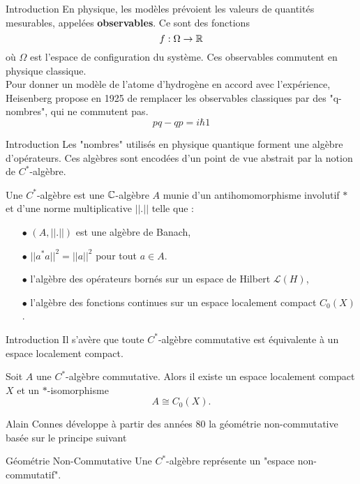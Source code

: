 \begin{frame}{Introduction}
En physique, les modèles prévoient les valeurs de quantités mesurables, appelées \textbf{observables}. Ce sont des fonctions
\[f:\Omega \rightarrow \mathbb R\]
où $\Omega$ est l'espace de configuration du système. Ces observables commutent en physique classique.\\
\vspace{0.3 cm} 
Pour donner un modèle de l'atome d'hydrogène en accord avec l'expérience, Heisenberg propose en 1925 de remplacer les observables classiques par des "q-nombres", qui ne commutent pas.
\[pq -qp = i\hbar 1\]
\end{frame}

\begin{frame}{Introduction}
Les "nombres" utilisés en physique quantique forment une algèbre d'opérateurs. Ces algèbres sont encodées d'un point de vue abstrait par la notion de $C^*$-algèbre. 
\vspace{0.3 cm}
\begin{definitionfr}
Une $C^*$-algèbre est une $\mathbb C$-algèbre $A$ munie d'un antihomomorphisme involutif $*$ et d'une norme multiplicative $||.||$ telle que :
\begin{itemize}
\item[$\bullet$] $(A,||.||)$ est une algèbre de Banach,
\item[$\bullet$] $||a^*a||^2 = ||a||^2$ pour tout $a\in A$.
\end{itemize}
\end{definitionfr}

\begin{itemize}
\item[$\bullet$] l'algèbre des opérateurs bornés sur un espace de Hilbert $\mathcal L(H)$, 
\item[$\bullet$] l'algèbre des fonctions continues sur un espace localement compact $C_0(X)$.
\end{itemize}

\end{frame}

\begin{frame}{Introduction}
Il s'avère que toute $C^*$-algèbre commutative est équivalente à un espace localement compact.
\begin{thmfr}
Soit $A$ une $C^*$-algèbre commutative. Alors il existe un espace localement compact $X$ et un $*$-isomorphisme 
\[A\cong C_0(X).\]
\end{thmfr}

Alain Connes développe à partir des années 80 la géométrie non-commutative basée sur le principe suivant
\begin{block}{Géométrie Non-Commutative}
Une $C^*$-algèbre représente un "espace non-commutatif". 
\end{block}

\end{frame}

